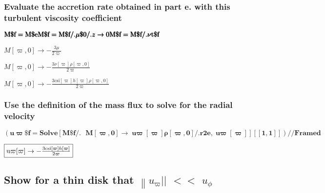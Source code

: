 \documentclass{article}
\begin{document}
\subsubsection*{Evaluate the accretion rate obtained in part e. with this turbulent viscosity coefficient}

\begin{doublespace}
\noindent\(\pmb{\text{M$\$$f} = \text{M$\$$e} }\\
\pmb{\text{M$\$$f} = \text{M$\$$f} \text{/.} \text{$\mu \$$0} \text{/.} z\to 0 }\\
\pmb{\text{M$\$$f} =\text{M$\$$f} \text{/.} \text{$\nu $t$\$$f}}\)
\end{doublespace}

\begin{doublespace}
\noindent\(M[\varpi ,0]\to -\frac{3 \mu }{2 \varpi }\)
\end{doublespace}

\begin{doublespace}
\noindent\(M[\varpi ,0]\to -\frac{3 \nu [\varpi ] \rho [\varpi ,0]}{2 \varpi }\)
\end{doublespace}

\begin{doublespace}
\noindent\(M[\varpi ,0]\to -\frac{3 \text{csi}[\varpi ] h[\varpi ] \rho [\varpi ,0]}{2 \varpi }\)
\end{doublespace}

\subsubsection*{Use the definition of the mass flux to solve for the radial velocity}

\begin{doublespace}
\noindent\(\pmb{(\text{u$\varpi \$$f} =\text{Solve}[\text{M$\$$f} \text{/.}\text{  }M[\varpi ,0]\to  \text{u$\varpi $}[\varpi ] \rho [\varpi ,0]
\text{/.} \text{r2e}, \text{u$\varpi $}[\varpi ]][[1,1]]) \text{//}\text{Framed}}\)
\end{doublespace}

\begin{doublespace}
\noindent\(\fbox{$\text{u$\varpi $}[\varpi ]\to -\frac{3 \text{csi}[\varpi ] h[\varpi ]}{2 \varpi }$}\)
\end{doublespace}

\subsection*{Show for a thin disk that \(\left\|u_{\varpi }\right.\)$||$ $<<$ \(u_{\phi }\)}
\end{document}
